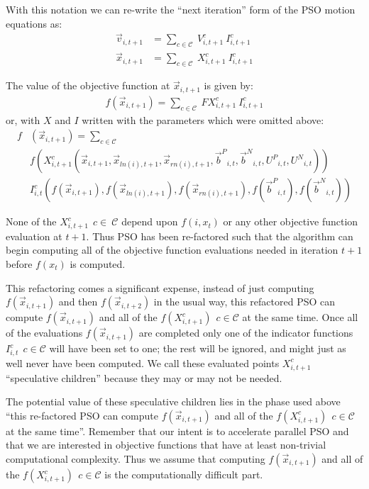 \documentclass[journal,letterpaper]{IEEEtran}
\providecommand{\pers}{\ensuremath{P}}
\providecommand{\neigh}{\ensuremath{N}}
\providecommand{\nURand}{\ensuremath{U^\neigh}}
\providecommand{\pURand}{\ensuremath{U^\pers}}
\providecommand{\ppos}{\ensuremath{\Vec{x}}}
\providecommand{\pvel}{\ensuremath{\Vec{v}}}
\providecommand{\nbest}{\ensuremath{\Vec{b}^\neigh}}
\providecommand{\pbest}{\ensuremath{\Vec{b}^\pers}}
\providecommand{\ofunc}{\ensuremath{f}}
\providecommand{\indic}{\ensuremath{I}}
\providecommand{\specvel}{\ensuremath{V}}
\providecommand{\specpos}{\ensuremath{X}}
\providecommand{\specval}{\ensuremath{FX}}
\providecommand{\ln}{\ensuremath{ln}}
\providecommand{\rn}{\ensuremath{rn}}
\providecommand{\caseset}{\ensuremath{\mathcal{C}}}
\begin{document}
With this notation we can re-write the ``next iteration'' form of the PSO motion equations as:
\begin{align}
\label{eq:vel2update}
	\pvel_{i,t+1} &= \sum_{c \in \caseset} \ \specvel_{i,t+1}^{c} \ \indic_{i,t+1}^{c} \\
\label{eq:pos2update}
	\ppos_{i,t+1} &= \sum_{c \in \caseset} \ \specpos_{i,t+1}^{c} \ \indic_{i,t+1}^{c}
\end{align}

The value of the objective function at $\ppos_{i,t+1}$ is given by:
\begin{align}
\label{eq:val2update}
	\ofunc (\ppos_{i,t+1}) = \sum_{c \in \caseset} \ \specval_{i,t+1}^{c} \ \indic_{i,t+1}^{c}
\end{align}
or, with $\specpos$ and $\indic$ written with the parameters which were omitted above:
\begin{align}
\nonumber
\ofunc & (\ppos_{i,t+1}) = \sum_{c \in \caseset} \\
\nonumber
& \ofunc(\specpos_{i,t+1}^{c}(\ppos_{i,t+1},\ppos_{\ln(i),t+1},\ppos_{\rn(i),t+1},
\pbest_{i,t},\nbest_{i,t},\pURand_{i,t}, \nURand_{i,t})) \\
\label{eq:val2updatelong}
& \indic_{i,t}^{c}(\ofunc ( \ppos_{i,t+1} ) ,\ofunc(\ppos_{\ln(i),t+1}),\ofunc(\ppos_{\rn(i),t+1}) ,\ofunc(\pbest_{i,t}) ,\ofunc(\nbest_{i,t}))
\end{align}

None of the $\specpos_{i,t+1}^{c} \ \ c \in\ \caseset$ depend upon $f(i,x_t)$
or any other objective function evaluation at $t+1$.
Thus PSO has been re-factored such that the algorithm can begin computing
all of the objective function evaluations needed in iteration $t+1$ before $f(x_t)$ is computed.

This refactoring comes a significant expense, instead of just computing
$\ofunc(\ppos_{i,t+1})$ and then $\ofunc(\ppos_{i,t+2})$ in the usual way, this refactored PSO
can compute $\ofunc(\ppos_{i,t+1})$ and all 
of the $\ofunc(\specpos_{i,t+1}^{c}) \ \ c \in \caseset$ at the same time.
Once all of the evaluations $f(\ppos_{i,t+1})$ are completed only one
of the indicator functions $\indic_{i,t}^{c} \ \ c \in \caseset$ will have been set to one;
the rest will be ignored, and might just as well never have been computed.
We call these evaluated points $\specpos_{i,t+1}^{c}$ ``speculative children''
because they may or may not be needed.

The potential value of these speculative children lies in the phase used above
``this re-factored PSO
can compute $\ofunc(\ppos_{i,t+1})$ and all 
of the $\ofunc(\specpos_{i,t+1}^{c}) \ \ c \in \caseset$ at the same time''. 
Remember that our intent is to accelerate parallel PSO and that we
are interested in objective functions that have at least non-trivial computational
complexity.
Thus we assume that computing
$\ofunc(\ppos_{i,t+1})$ and all 
of the $\ofunc(\specpos_{i,t+1}^{c}) \ \ c \in \caseset$ is the computationally difficult part.
\end{document}
